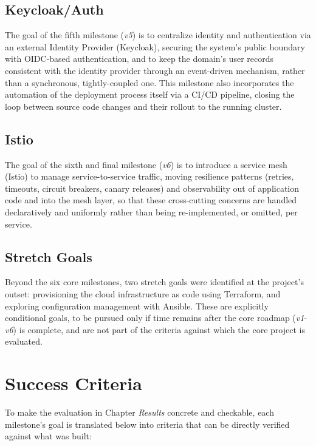 \documentclass[twoside]{supsistudent}
\begin{document}
\subsection{Keycloak/Auth}
The goal of the fifth milestone (\emph{v5}) is to centralize identity and authentication via an external Identity Provider (Keycloak), securing the system's public boundary with OIDC-based authentication, and to keep the domain's user records consistent with the identity provider through an event-driven mechanism, rather than a synchronous, tightly-coupled one. This milestone also incorporates the automation of the deployment process itself via a CI/CD pipeline, closing the loop between source code changes and their rollout to the running cluster.

\subsection{Istio}
The goal of the sixth and final milestone (\emph{v6}) is to introduce a service mesh (Istio) to manage service-to-service traffic, moving resilience patterns (retries, timeouts, circuit breakers, canary releases) and observability out of application code and into the mesh layer, so that these cross-cutting concerns are handled declaratively and uniformly rather than being re-implemented, or omitted, per service.

\subsection{Stretch Goals}
Beyond the six core milestones, two stretch goals were identified at the project's outset: provisioning the cloud infrastructure as code using Terraform, and exploring configuration management with Ansible. These are explicitly conditional goals, to be pursued only if time remains after the core roadmap (\emph{v1}-\emph{v6}) is complete, and are not part of the criteria against which the core project is evaluated.

\section{Success Criteria}
To make the evaluation in Chapter \emph{Results} concrete and checkable, each milestone's goal is translated below into criteria that can be directly verified against what was built:
\end{document}
